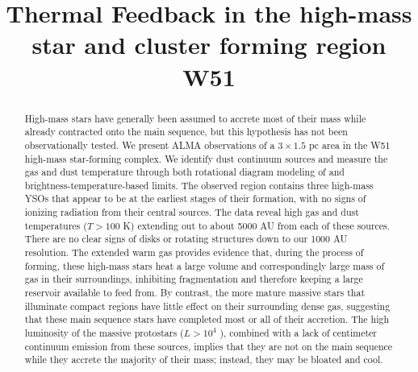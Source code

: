 \documentclass{emulateapj}
\begin{document}
\title{Thermal Feedback in the high-mass star and cluster forming region W51}




\begin{abstract}
    High-mass stars have generally been assumed to accrete most of their
    mass while already contracted onto the main sequence, but this
    hypothesis has not been observationally tested.
    We present ALMA observations of a $3\times1.5$ pc area in the W51
    high-mass star-forming complex.  We identify dust continuum sources and
    measure the gas and dust temperature through both rotational diagram
    modeling of \methanol and brightness-temperature-based limits.  The
    observed region contains three high-mass YSOs that appear to be at the
    earliest stages of their formation, with no signs of ionizing radiation
    from their central sources.
    The data reveal high gas and dust
    temperatures ($T > 100$ K) extending out to about 5000 AU from each of
    these sources.  There are no clear signs of disks or rotating
    structures down to our 1000 AU resolution.
    The extended warm gas provides evidence that, during the process of
    forming, these high-mass stars heat a large volume and correspondingly
    large mass of gas in their surroundings, inhibiting fragmentation and
    therefore keeping a large reservoir available to feed from.  By contrast,
    the more mature massive stars that illuminate compact \hii regions have
    little effect on their surrounding dense gas, suggesting that these main
    sequence stars have completed most or all of their accretion.  
    The high luminosity of the massive protostars ($L>10^4$ \lsun), combined
    with a lack of centimeter continuum emission from these sources, implies
    that they are not on the main sequence while they accrete the majority of
    their mass; instead, they may be bloated and cool.


    

\end{abstract}
\end{document}
